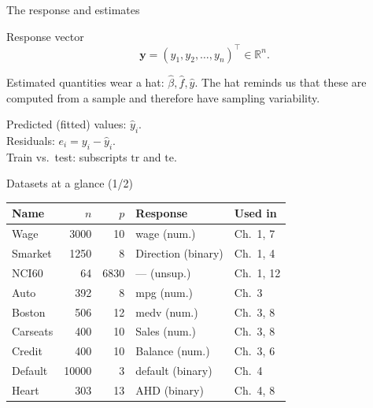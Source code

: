 \documentclass[aspectratio=169,11pt]{beamer}
\begin{document}
\begin{frame}{The response and estimates}
  \begin{block}{Response vector}
    \[ \mathbf{y} = (y_1, y_2, \ldots, y_n)^\top \in \mathbb{R}^n. \]
  \end{block}
  \begin{readme}
    Estimated quantities wear a hat: $\hat{\beta}, \hat{f}, \hat{y}$.
    The hat reminds us that these are computed from a sample and
    therefore have sampling variability.
  \end{readme}
  \begin{numexample}
    Predicted (fitted) values: $\hat{y}_i$.\\
    Residuals: $e_i = y_i - \hat{y}_i$.\\
    Train vs.\ test: subscripts $\mathrm{tr}$ and $\mathrm{te}$.
  \end{numexample}
\end{frame}

\begin{frame}{Datasets at a glance (1/2)}
  \footnotesize
  \begin{tabular}{lrrll}
    \toprule
    \textbf{Name} & $n$ & $p$ & \textbf{Response} & \textbf{Used in} \\
    \midrule
    Wage         & 3000 &  10 & wage (num.)        & Ch.~1, 7 \\
    Smarket      & 1250 &   8 & Direction (binary) & Ch.~1, 4 \\
    NCI60        &   64 & 6830 & --- (unsup.)       & Ch.~1, 12 \\
    Auto         &  392 &   8 & mpg (num.)         & Ch.~3 \\
    Boston       &  506 &  12 & medv (num.)        & Ch.~3, 8 \\
    Carseats     &  400 &  10 & Sales (num.)       & Ch.~3, 8 \\
    Credit       &  400 &  10 & Balance (num.)     & Ch.~3, 6 \\
    Default      & 10000 &  3 & default (binary)   & Ch.~4 \\
    Heart        &  303 &  13 & AHD (binary)       & Ch.~4, 8 \\
    \bottomrule
  \end{tabular}
\end{frame}
\end{document}
